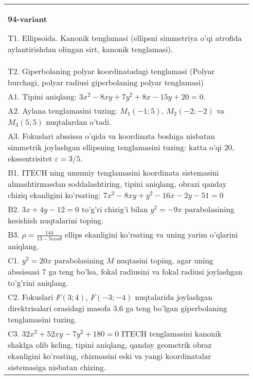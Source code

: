 \documentclass{article}
\begin{document}
\begin{tabular}{m{17cm}}
\textbf{94-variant}
\newline

T1. Ellipsoida. Kanonik tenglamasi (ellipsni simmetriya o'qi atrofida aylantirishdan olingan sirt, kanonik tenglamasi).\\

T2. Giperbolaning polyar koordinatadagi tenglamasi (Polyar burchagi, polyar radiusi giperbolaning polyar tenglamasi)\\

A1. Tipini aniqlang: $3x^{2}-8xy+7y^{2}+8x-15y+20=0$.\\

A2. Aylana tenglamasini tuzing: $M_1(-1;5)$, $M_2(-2;-2)$ va $M_3(5;5)$ nuqtalardan o'tadi.\\

A3. Fokuslari abssissa o'qida va koordinata boshiga nisbatan simmetrik joylashgan ellipsning tenglamasini tuzing: katta o'qi $20$, ekssentrisitet $\varepsilon=3/5$.\\

B1. ITECH ning umumiy tenglamasini koordinata sistemasini almashtirmasdan soddalashtiring, tipini aniqlang, obrazi qanday chiziq ekanligini ko'rsating: $7x^{2} - 8xy + y^{2} - 16x - 2y - 51 = 0$\\

B2. $3x + 4y - 12 = 0$ to'g'ri chizig'i bilan $y^{2} = - 9x$ parabolasining kesishish nuqtalarini toping.  \\

B3. $\rho = \frac{144}{13 - 5cos\theta}$ ellips ekanligini ko'rsating va uning yarim o'qlarini aniqlang.\\

C1. $y^{2} = 20x$ parabolasining $M$ nuqtasini toping, agar uning abssissasi 7 ga teng bo'lsa, fokal radiusini va fokal radiusi joylashgan to'g'rini aniqlang.\\

C2. Fokuslari $F(3;4)$, $F(-3;-4)$ nuqtalarida joylashgan direktrisalari orasidagi masofa 3,6 ga teng bo'lgan giperbolaning tenglamasini tuzing.  \\

C3. $32x^{2} + 52xy - 7y^{2} + 180 = 0$ ITECH tenglamasini kanonik shaklga olib keling, tipini aniqlang, qanday geometrik obraz ekanligini ko'rsating, chizmasini eski va yangi koordinatalar sistemasiga nisbatan chizing.  \\

\end{tabular}
\vspace{1cm}
\end{document}
